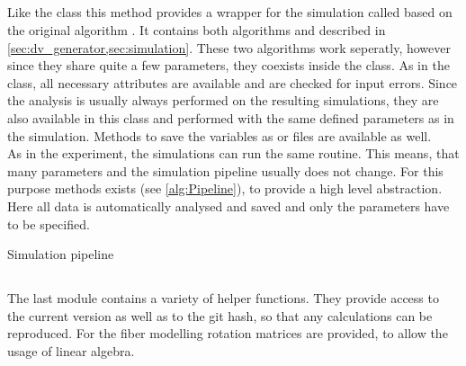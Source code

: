 \subsection{}
Like the  class this method provides a wrapper for the simulation called  based on the original algorithm \cite{Dohmen2015,Lucksch2016}.
It contains both algorithms  and  described in \cref{sec:dv_generator,sec:simulation}.
These two algorithms work seperatly, however since they share quite a few parameters, they coexists inside the class.
As in the  class, all necessary attributes are available and are checked for input errors.
Since the analysis is usually always performed on the resulting simulations, they are also available in this class and performed with the same defined parameters as in the simulation.
Methods to save the variables as  or \hdf{} files are available as well.
\\
As in the experiment, the simulations can run the same routine.
This means, that many parameters and the simulation pipeline usually does not change.
For this purpose  methods exists (see \cref{alg:Pipeline}), to provide a high level abstraction.
Here all data is automatically analysed and saved and only the parameters have to be specified.
% 
\begin{lstfloat}[!tb]
\centering
\scalebox{0.75}{
\begin{minipage}{\the\textwidth}

\end{minipage}}
\caption{Simulation pipeline}
\label{alg:Pipeline}
\end{lstfloat}
% 
% 
\subsection{}
The last module contains a variety of helper functions.
They provide access to the current version as well as to the git hash, so that any calculations can be reproduced.
For the fiber modelling rotation matrices are provided, to allow the usage of linear algebra.
% 
% 
% 
